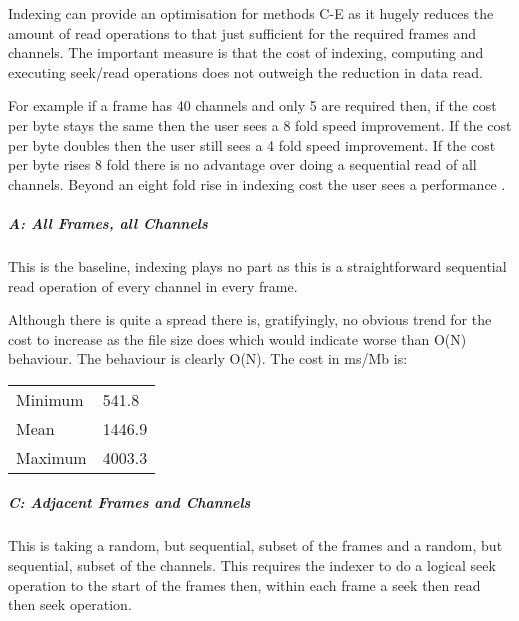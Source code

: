 \documentclass[letterpaper,10pt,english]{sphinxmanual}
\begin{document}
Indexing can provide an optimisation for methods C-E as it hugely reduces the amount of read operations to that just sufficient for the required frames and channels. The important measure is that the cost of indexing, computing and executing seek/read operations does not outweigh the reduction in data read.

For example if a frame has 40 channels and only 5 are required then, if the cost per byte stays the same then the user sees a 8 fold speed improvement. If the cost per byte doubles then the user still sees a 4 fold speed improvement. If the cost per byte rises 8 fold there is no advantage over doing a sequential read of all channels. Beyond an eight fold rise in indexing cost the user sees a performance .


\subparagraph{A: All Frames, all Channels}
\label{\detokenize{tech/performance:a-all-frames-all-channels}}
This is the baseline, indexing plays no part as this is a straightforward sequential read operation of every channel in every frame.

\noindent{}

Although there is quite a spread there is, gratifyingly, no obvious trend for the cost to increase as the file size does which would indicate worse than O(N) behaviour. The behaviour is clearly O(N). The cost in ms/Mb is:


\begin{savenotes}\sphinxattablestart
\centering
\begin{tabulary}{\linewidth}[t]{|T|T|}
\hline
{}\relax &\relax \\
\hline
Minimum
&
541.8
\\
\hline
Mean
&
1446.9
\\
\hline
Maximum
&
4003.3
\\
\hline
\end{tabulary}
\par
\sphinxattableend\end{savenotes}


\subparagraph{C: Adjacent Frames and Channels}
\label{\detokenize{tech/performance:c-adjacent-frames-and-channels}}
This is taking a random, but sequential, subset of the frames and a random, but sequential, subset of the channels. This requires the indexer to do a logical seek operation to the start of the frames then, within each frame a seek then read then seek operation.
\end{document}
